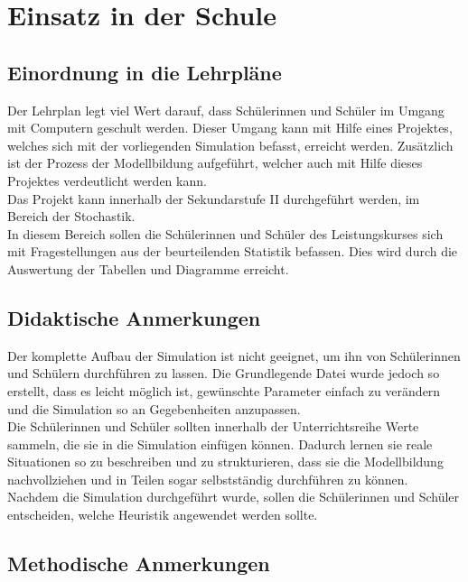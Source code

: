 \section{Einsatz in der Schule}
\subsection{Einordnung in die Lehrpläne}

Der Lehrplan legt viel Wert darauf, dass Schülerinnen und Schüler im Umgang mit Computern geschult werden. Dieser Umgang kann mit Hilfe eines Projektes, welches sich mit der vorliegenden Simulation befasst, erreicht werden. Zusätzlich ist der Prozess der Modellbildung aufgeführt, welcher auch mit Hilfe dieses Projektes verdeutlicht werden kann.\\
Das Projekt kann innerhalb der Sekundarstufe II durchgeführt werden, im Bereich der Stochastik. \\
In diesem Bereich sollen die Schülerinnen und Schüler des Leistungskurses sich mit Fragestellungen aus der beurteilenden Statistik befassen. Dies wird durch die Auswertung der Tabellen und Diagramme erreicht. 

\subsection{Didaktische Anmerkungen}

Der komplette Aufbau der Simulation ist nicht geeignet, um ihn von Schülerinnen und Schülern durchführen zu lassen. Die Grundlegende Datei wurde jedoch so erstellt, dass es leicht möglich ist, gewünschte Parameter einfach zu verändern und die Simulation so an Gegebenheiten anzupassen.\\
Die Schülerinnen und Schüler sollten innerhalb der Unterrichtsreihe Werte sammeln, die sie in die Simulation einfügen können. Dadurch lernen sie reale Situationen so zu beschreiben und zu strukturieren, dass sie die Modellbildung nachvollziehen und in Teilen sogar selbstständig durchführen zu können.\\
Nachdem die Simulation durchgeführt wurde, sollen die Schülerinnen und Schüler entscheiden, welche Heuristik angewendet werden sollte. 

\subsection{Methodische Anmerkungen}

